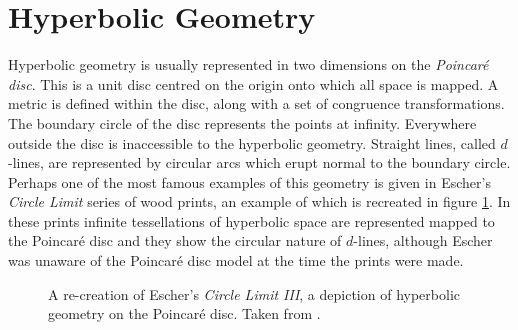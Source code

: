 
\section{Hyperbolic Geometry}

Hyperbolic geometry is usually represented in two dimensions on the
\emph{Poincar\'e disc}. This is a unit disc centred on the origin
onto which all space is mapped. A metric is defined within the
disc\cite{GEOM:Brannan}, along with a set of congruence transformations.
The boundary circle of the disc represents the points at infinity. Everywhere
outside the disc is inaccessible to the hyperbolic geometry. Straight lines,
called $d$-lines\cite{GEOM:Brannan}, are represented by circular arcs which
erupt normal to the boundary circle. Perhaps one of the most famous examples of this
geometry is given in Escher's \emph{Circle Limit} series of wood prints, an example of
which is recreated in figure \ref{fig:circlelimit}. In these prints infinite
tessellations of hyperbolic space are represented mapped to the Poincar\'e
disc and they show the circular nature of $d$-lines, although Escher was
unaware of the Poincar\'e disc model at the time the prints were made.

\begin{figure} \centering
{}
\caption{A re-creation of Escher's \emph{Circle Limit III}, 
a depiction of hyperbolic geometry on the Poincar\'e disc.
Taken from \cite{transhyp}.}
\label{fig:circlelimit}
\end{figure}

